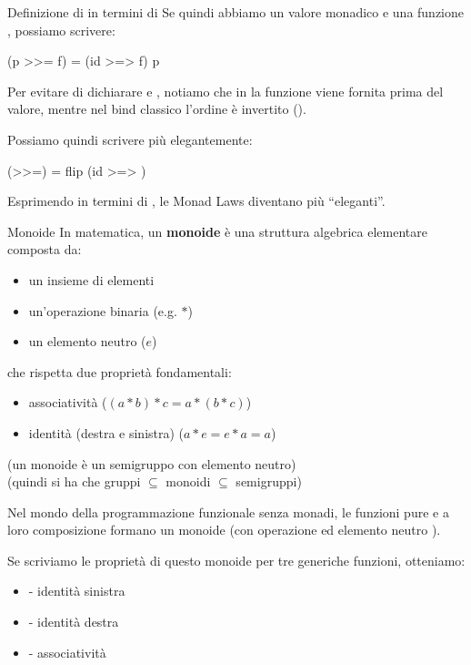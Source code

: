 \begin{gframe}{Definizione di \code{>>=} in termini di \code{>=>}}
Se quindi abbiamo un valore monadico  e una funzione , possiamo scrivere:
\begin{haskellbox}{}
(p >>= f) = (id >=> f) p
\end{haskellbox}

Per evitare di dichiarare  e , notiamo che in  la funzione viene fornita prima del valore, mentre nel bind classico l'ordine è invertito ().

Possiamo quindi scrivere più elegantemente:
\begin{haskellbox}{}
(>>=) = flip (id >=> )
\end{haskellbox}

Esprimendo \code{>>=} in termini di \code{>=>}, le Monad Laws diventano più ``eleganti''.

\begin{defframe}{Monoide}{}
    \label{monoid}
In matematica, un \textbf{monoide} è una struttura algebrica elementare composta da:
\begin{itemize}
    \item un insieme di elementi
    \item un'operazione binaria (e.g. $*$)
    \item un elemento neutro ($e$)
\end{itemize}

che rispetta due proprietà fondamentali:
\begin{itemize}
    \item associatività ($(a*b) * c = a * (b * c)$)
    \item identità (destra e sinistra) ($a * e = e * a = a$)
\end{itemize}
(un monoide è un semigruppo con elemento neutro)\\
(quindi si ha che gruppi $\subseteq$ monoidi $\subseteq$ semigruppi)
\end{defframe}

Nel mondo della programmazione funzionale senza monadi, le funzioni pure e a loro composizione formano un monoide (con operazione  ed elemento neutro ).

Se scriviamo le proprietà di questo monoide per tre generiche funzioni, otteniamo:
\begin{itemize}
    \item {} - identità sinistra
    \item {} - identità destra
    \item {} - associatività
\end{itemize}


\end{gframe}
